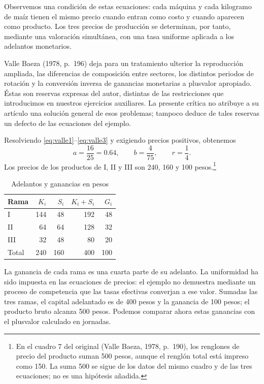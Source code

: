 \documentclass[10pt,twoside]{article}
\begin{document}
Observemos una condición de estas ecuaciones: cada máquina y cada kilogramo de maíz tienen el mismo precio cuando entran como costo y cuando aparecen como producto. Los tres precios de producción se determinan, por tanto, mediante una valoración simultánea, con una tasa uniforme aplicada a los adelantos monetarios.

Valle Baeza (1978, p.~196) deja para un tratamiento ulterior la reproducción ampliada, las diferencias de composición entre sectores, los distintos periodos de rotación y la conversión inversa de ganancias monetarias a plusvalor apropiado. Éstas son reservas expresas del autor, distintas de las restricciones que introducimos en nuestros ejercicios auxiliares. La presente crítica no atribuye a su artículo una solución general de esos problemas; tampoco deduce de tales reservas un defecto de las ecuaciones del ejemplo.



Resolviendo \eqref{eq:valle1}--\eqref{eq:valle3} y exigiendo precios positivos, obtenemos
\[
a=\frac{16}{25}=0.64,\qquad b=\frac4{75},\qquad r=\frac14.
\]
Los precios de los productos de I, II y III son 240, 160 y 100 pesos.\footnote{En el cuadro 7 del original (Valle Baeza, 1978, p.~190), los renglones de precio del producto suman 500 pesos, aunque el renglón total está impreso como 150. La suma 500 se sigue de los datos del mismo cuadro y de las tres ecuaciones; no es una hipótesis añadida.}


\begin{table}[H]\centering\footnotesize
\caption{Adelantos y ganancias en pesos}
\begin{tabular}{@{}lrrrr@{}}\toprule
Rama & $K_i$ & $S_i$ & $K_i+S_i$ & $G_i$\\\midrule
I & 144 & 48 & 192 & 48\\
II & 64 & 64 & 128 & 32\\
III & 32 & 48 & 80 & 20\\\midrule
Total & 240 & 160 & 400 & 100\\\bottomrule
\end{tabular}
\end{table}
La ganancia de cada rama es una cuarta parte de su adelanto. La uniformidad ha sido impuesta en las ecuaciones de precios: el ejemplo no demuestra mediante un proceso de competencia que las tasas efectivas converjan a ese valor. Sumadas las tres ramas, el capital adelantado es de 400 pesos y la ganancia de 100 pesos; el producto bruto alcanza 500 pesos. Podemos comparar ahora estas ganancias con el plusvalor calculado en jornadas.
\end{document}
